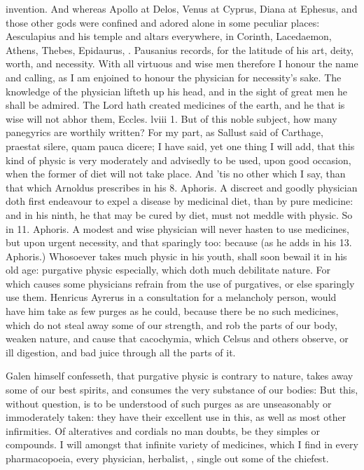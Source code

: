 {invention. And whereas Apollo at Delos, Venus at Cyprus, Diana at
Ephesus, and those other gods were confined and adored alone in some
peculiar places: Aesculapius and his temple and altars everywhere, in
Corinth, Lacedaemon, Athens, Thebes, Epidaurus, \etc{}. Pausanius records,
for the latitude of his art, deity, worth, and necessity. With all
virtuous and wise men therefore I honour the name and calling, as I am
enjoined to honour the physician for necessity's sake. The knowledge of
the physician lifteth up his head, and in the sight of great men he
shall be admired. The Lord hath created medicines of the earth, and he
that is wise will not abhor them, Eccles. lviii 1. But of this noble
subject, how many panegyrics are worthily written? For my part, as
Sallust said of Carthage, praestat silere, quam pauca dicere; I have
said, yet one thing I will add, that this kind of physic is very
moderately and advisedly to be used, upon good occasion, when the
former of diet will not take place. And 'tis no other which I say, than
that which Arnoldus prescribes in his 8. Aphoris. A discreet and
goodly physician doth first endeavour to expel a disease by medicinal
diet, than by pure medicine: and in his ninth, he that may be
cured by diet, must not meddle with physic. So in 11. Aphoris. A
modest and wise physician will never hasten to use medicines, but upon
urgent necessity, and that sparingly too: because (as he adds in his
13. Aphoris.) Whosoever takes much physic in his youth, shall
soon bewail it in his old age: purgative physic especially, which doth
much debilitate nature. For which causes some physicians refrain from
the use of purgatives, or else sparingly use them. Henricus
Ayrerus in a consultation for a melancholy person, would have him take
as few purges as he could, because there be no such medicines, which do
not steal away some of our strength, and rob the parts of our body,
weaken nature, and cause that cacochymia, which Celsus and others
observe, or ill digestion, and bad juice through all the parts of it.

Galen himself confesseth, that purgative physic is contrary to
nature, takes away some of our best spirits, and consumes the very
substance of our bodies: But this, without question, is to be
understood of such purges as are unseasonably or immoderately taken:
they have their excellent use in this, as well as most other
infirmities. Of alteratives and cordials no man doubts, be they simples
or compounds. I will amongst that infinite variety of medicines, which
I find in every pharmacopoeia, every physician, herbalist, \etc{}, single
out some of the chiefest.

}
